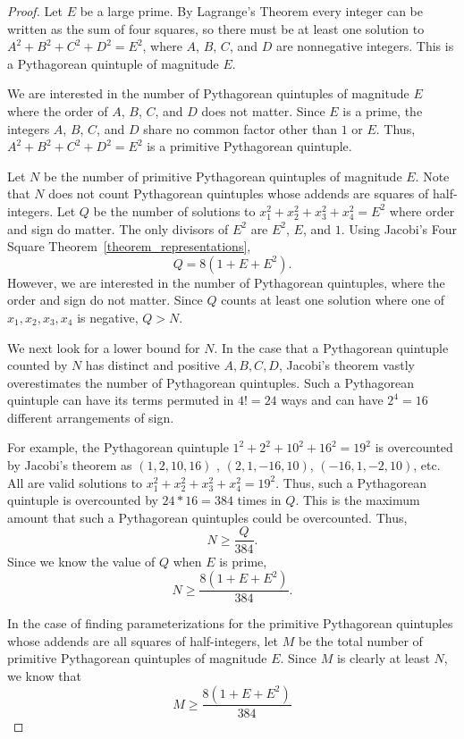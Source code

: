 \documentclass[12pt,table]{article}
\theoremstyle{definition}
\theoremstyle{remark}
\numberwithin{equation}{section}
\begin{document}
\begin{proof}
Let $E$ be a large prime. 
By Lagrange's Theorem every integer can be written as the sum of 
four squares, 
so
there must be at least one solution to
$A^2 + B^2 + C^2 + D^2 = E^2$, where $A$, $B$, $C$, and $D$ are
 nonnegative integers. This is a Pythagorean quintuple of magnitude $E$.


We are interested in the number of Pythagorean quintuples of magnitude
$E$
where the
order of $A$, $B$, $C$, and $D$ does not matter.  
Since $E$ is a prime,
the integers  $A$, $B$, $C$, and $D$ share no
common factor other than $1$ or $E$. 
Thus, $A^2 + B^2 + C^2 + D^2 = E^2$ is a primitive Pythagorean
quintuple. 


Let $N$ be the number of primitive
Pythagorean quintuples of magnitude $E$. Note that $N$ does not count
Pythagorean quintuples whose addends  are squares of  half-integers.
Let $Q$ be the number of solutions to 
$x_1^2 +  x_2^2 +  x_3^2 +  x_4^2 = E^2$
where order and sign do matter.
The only divisors of $E^2$ are
$E^2$, $E$, and $1$. Using 
Jacobi's Four Square Theorem~\ref{theorem_representations}, 
$$
     Q = 8(1 + E + E^2).
$$
However, we are interested in the number of Pythagorean quintuples,
where the order and sign do not matter. Since $Q$ counts at least one
solution where one of $x_1,x_2,x_3,x_4$ is negative, $Q > N$.



We next look for a lower bound for $N$.
In the case that a Pythagorean quintuple counted by $N$ 
has distinct and positive $A,B,C,D$,
Jacobi's theorem vastly  overestimates the number of
Pythagorean quintuples. 
Such a Pythagorean quintuple can have its terms  permuted in 
$4! = 24$ ways and can have $2^4 = 16$ different arrangements of sign.


For example, the Pythagorean quintuple
 $1^2 + 2^2 + 10^2 + 16^2 = 19^2$ is overcounted by
Jacobi's theorem as
$(1,2,10,16)$ , $(2,1,-16,10)$, $(-16,1,-2,10)$, etc.
All are valid solutions to
$x_1^2 +  x_2^2 +  x_3^2 +  x_4^2 = 19^2$.
Thus, such a Pythagorean quintuple
is overcounted by $24*16 = 384$ times in $Q$. 
This is the maximum amount that such a Pythagorean
quintuples could be overcounted.
Thus,
$$
     N \geq \frac{Q}{384}.
$$ 
Since we know the value of $Q$ when $E$ is prime,
$$
     N \geq \frac{ 8(1+E+E^2) }{384}.
$$ 

In the case of
finding parameterizations for the primitive Pythagorean
quintuples whose addends are all squares of half-integers,
let $M$ be the total  number of 
primitive Pythagorean quintuples of magnitude $E$. Since $M$ is clearly 
at least $N$, we know that 
\begin{equation}
\label{lower}
M \geq \frac{ 8(1+E+E^2) }{384}
\end{equation}


\end{proof}
\end{document}
